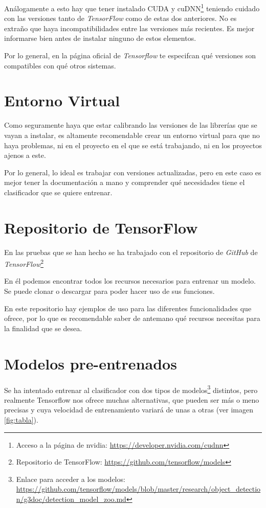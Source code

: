 Análogamente a esto hay que tener instalado CUDA y cuDNN\footnote{Acceso a la página de nvidia: \url{https://developer.nvidia.com/cudnn}} teniendo cuidado con las versiones tanto de \textit{TensorFlow} como de estas dos anteriores. No es extraño que haya incompatibilidades entre las versiones más recientes. Es mejor informarse bien antes de instalar ninguno de estos elementos.

Por lo general, en la página oficial de \textit{Tensorflow} te especifcan qué versiones son compatibles con qué otros sistemas\cite{ten}.

\section{Entorno Virtual}
Como seguramente haya que estar calibrando las versiones de las librerías que se vayan a instalar, es altamente recomendable crear un entorno virtual para que no haya problemas, ni en el proyecto en el que se está trabajando, ni en los proyectos ajenos a este.

Por lo general, lo ideal es trabajar con versiones actualizadas, pero en este caso es mejor tener la documentación a mano y comprender qué necesidades tiene el clasificador que se quiere entrenar.

\section{Repositorio de TensorFlow}
En las pruebas que se han hecho se ha trabajado con el repositorio de \textit{GitHub} de \textit{TensorFlow}\footnote{Repositorio de TensorFlow: \url{https://github.com/tensorflow/models}}

En él podemos encontrar todos los recursos necesarios para entrenar un modelo.
Se puede clonar o descargar para poder hacer uso de sus funciones.

En este repositorio hay ejemplos de uso para las diferentes funcionalidades que ofrece, por lo que es recomendable saber de antemano qué recursos necesitas para la finalidad que se desea.

\section{Modelos pre-entrenados}
Se ha intentado entrenar al clasificador con dos tipos de modelos\footnote{Enlace para acceder a los modelos: \url{https://github.com/tensorflow/models/blob/master/research/object_detection/g3doc/detection_model_zoo.md}} distintos, pero realmente Tensorflow nos ofrece muchas alternativas, que pueden ser más o meno precisas y cuya velocidad de entrenamiento variará de unas a otras (ver imagen \ref{fig:tabla}).


